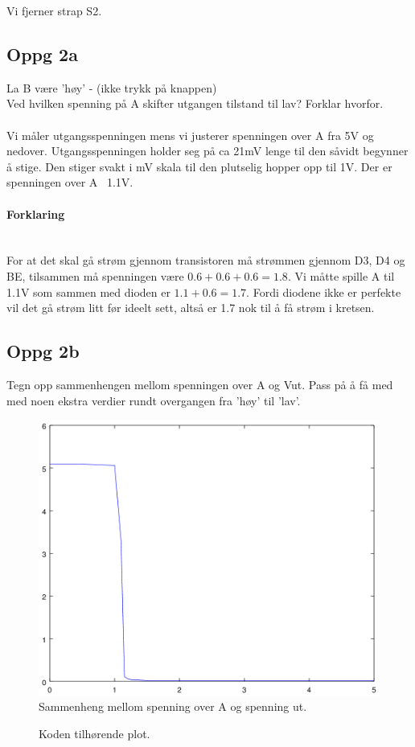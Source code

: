 Vi fjerner strap S2.

\subsection{Oppg 2a}
La B være ’høy’ - (ikke trykk på knappen) \\
Ved hvilken spenning på A skifter utgangen tilstand til lav? Forklar hvorfor.
\\\\
Vi måler utgangsspenningen mens vi justerer spenningen over A fra 5V og nedover.
Utgangsspenningen holder seg på ca 21mV lenge til den såvidt begynner å stige.
Den stiger svakt i mV skala til den plutselig hopper opp til 1V.
Der er spenningen over A ~1.1V.

\paragraph{Forklaring} \mbox{} \\
For at det skal gå strøm gjennom transistoren må strømmen gjennom D3, D4 og BE,
tilsammen må spenningen være $0.6 + 0.6 + 0.6 = 1.8$.
Vi måtte spille A til 1.1V som sammen med dioden er $1.1 + 0.6 = 1.7$.
Fordi diodene ikke er perfekte vil det gå strøm litt før ideelt sett,
altså er 1.7 nok til å få strøm i kretsen.



\subsection{Oppg 2b}
Tegn opp sammenhengen mellom spenningen over A og 
Vut.  
Pass på å få med med noen ekstra verdier rundt overgangen 
fra ’høy’ til ’lav’.
\begin{figure}[H]
  \caption{Sammenheng mellom spenning over A og spenning ut.}
  \centering
    \includegraphics[width=\textwidth]{2b.png}
\end{figure}

\begin{figure}[H]
  
  \caption{Koden tilhørende plot.}
\end{figure}
